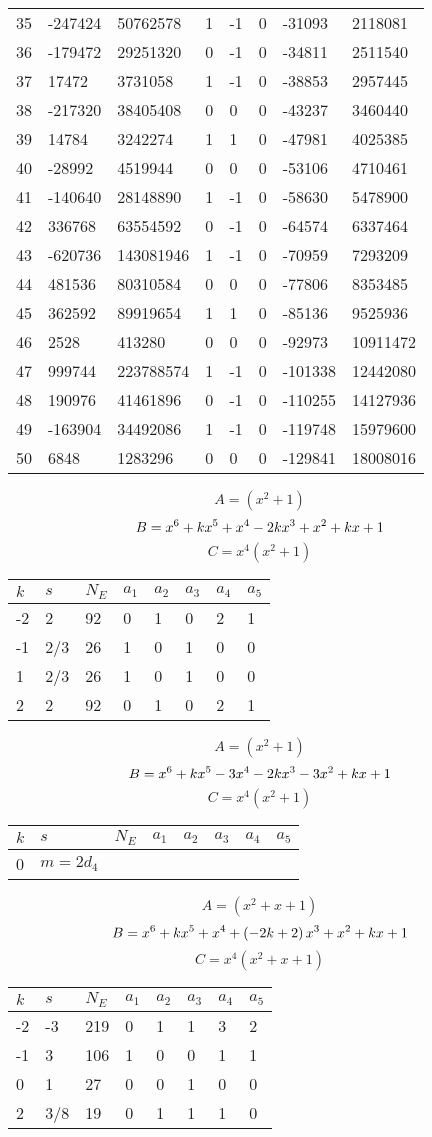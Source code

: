 \documentclass{amsart}
\begin{document}
\begin{longtable}{|l|l|l|lllll|}
35&-247424&50762578&1&-1&0&-31093&2118081\\
36&-179472&29251320&0&-1&0&-34811&2511540\\
37&17472&3731058&1&-1&0&-38853&2957445\\
38&-217320&38405408&0&0&0&-43237&3460440\\
39&14784&3242274&1&1&0&-47981&4025385\\
40&-28992&4519944&0&0&0&-53106&4710461\\
41&-140640&28148890&1&-1&0&-58630&5478900\\
42&336768&63554592&0&-1&0&-64574&6337464\\
43&-620736&143081946&1&-1&0&-70959&7293209\\
44&481536&80310584&0&0&0&-77806&8353485\\
45&362592&89919654&1&1&0&-85136&9525936\\
46&2528&413280&0&0&0&-92973&10911472\\
47&999744&223788574&1&-1&0&-101338&12442080\\
48&190976&41461896&0&-1&0&-110255&14127936\\
49&-163904&34492086&1&-1&0&-119748&15979600\\
50&6848&1283296&0&0&0&-129841&18008016\\
\hline
\end{longtable}
$$A=(x^2
 + 1)$$
$$B=x^6
 + k\*x^5
 + x^4
 - 2\*k\*x^3
 + x^2
 + k\*x
 + 1$$
$$C=x^4(x^2
 + 1)$$
\begin{longtable}{|l|l|l|lllll|}
\hline
$k$ & $s$ & $N_E$ & $a_1$ & $a_2$ & $a_3$ & $a_4$ & $a_5$\\
\hline
-2&2&92&0&1&0&2&1\\
-1&2/3&26&1&0&1&0&0\\
1&2/3&26&1&0&1&0&0\\
2&2&92&0&1&0&2&1\\
\hline
\end{longtable}
$$A=(x^2
 + 1)$$
$$B=x^6
 + k\*x^5
 - 3\*x^4
 - 2\*k\*x^3
 - 3\*x^2
 + k\*x
 + 1$$
$$C=x^4(x^2
 + 1)$$
\begin{longtable}{|l|l|l|lllll|}
\hline
$k$ & $s$ & $N_E$ & $a_1$ & $a_2$ & $a_3$ & $a_4$ & $a_5$\\
\hline
0&$m=2d_{4}$&&\multicolumn{5}{c|}{}\\
\hline
\end{longtable}
$$A=(x^2
 + x
 + 1)$$
$$B=x^6
 + k\*x^5
 + x^4
 + \left(-2\*k
 + 2\right) \*x^3
 + x^2
 + k\*x
 + 1$$
$$C=x^4(x^2
 + x
 + 1)$$
\begin{longtable}{|l|l|l|lllll|}
\hline
$k$ & $s$ & $N_E$ & $a_1$ & $a_2$ & $a_3$ & $a_4$ & $a_5$\\
\hline
-2&-3&219&0&1&1&3&2\\
-1&3&106&1&0&0&1&1\\
0&1&27&0&0&1&0&0\\
2&3/8&19&0&1&1&1&0\\
\hline
\end{longtable}
\end{document}

